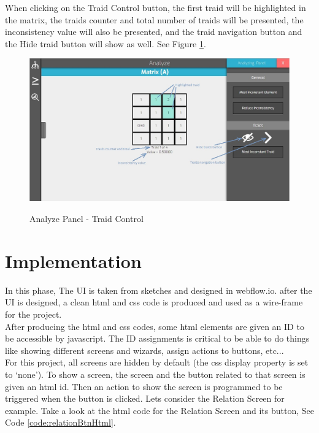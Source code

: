 \documentclass[11pt]{article} %
\begin{document}
\noindent
When clicking on the Traid Control button, the first traid will be highlighted in the matrix, the traids counter and total number of traids will be presented, the inconsistency value will also be presented, and the traid navigation button and the Hide traid button will show as well. See Figure \ref{screenshot:analyze traid control}.

\begin{figure}
  \caption{Analyze Panel - Traid Control}
  \centering
  \includegraphics[width=\textwidth]{analyzeTraidControl}
  \label{screenshot:analyze traid control}
\end{figure}

\newpage
\section{Implementation}
In this phase, The UI is taken from sketches and designed in webflow.io. after the UI is designed, a clean html and css code is produced and used as a wire-frame for the project.\\
After producing the html and css codes, some html elements are given an ID to be accessible by javascript. The ID assignments is critical to be able to do things like showing different screens and wizards, assign actions to buttons, etc...\\
For this project, all screens are hidden by default (the css display property is set to `none'). To show a screen, the screen and the button related to that screen is given an html id. Then an action to show the screen is programmed to be triggered when the button is clicked.
Lets consider the Relation Screen for example. Take a look at the html code for the Relation Screen and its button, See Code \ref{code:relationBtnHtml}.
\end{document}
